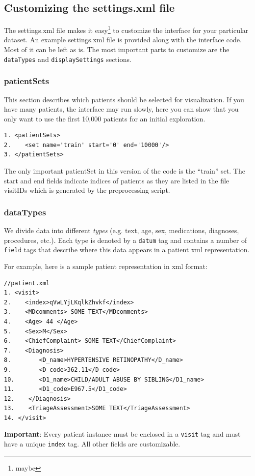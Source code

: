 \documentclass[12pt]{article}
\begin{document}
\subsection{Customizing the settings.xml file}
\label{sec:custom_settings}
The settings.xml file makes it easy\footnote{maybe} to customize the interface for your particular dataset. An example settings.xml file is provided along with the interface code. Most of it can be left as is. The most important parts to customize are the {\tt dataTypes} and {\tt displaySettings} sections.

\subsubsection{patientSets}
This section describes which patients should be selected for visualization. If you have many patients, the interface may run slowly, here you can show that you only want to use the first 10,000 patients for an initial exploration.

\begin{verbatim}
1. <patientSets>
2.    <set name='train' start='0' end='10000'/>
3. </patientSets>
\end{verbatim}

The only important patientSet in this version of the code is the ``train'' set. The start and end fields indicate indices of patients as they are listed in the file visitIDs which is generated by the preprocessing script.


\subsubsection{dataTypes}
\label{sec:dataTypes}
We divide data into different {\em types} (e.g. text, age, sex, medications, diagnoses, procedures, etc.). Each type is denoted by a {\tt datum} tag and contains a number of {\tt field} tags that describe where this data appears in a patient xml representation.

For example, here is a sample patient representation in xml format:

\begin{verbatim}
//patient.xml
1. <visit>
2.    <index>qVwLYjLKqlkZhvkf</index>
3.    <MDcomments> SOME TEXT</MDcomments>
4.    <Age> 44 </Age>
5.    <Sex>M</Sex>
6.    <ChiefComplaint> SOME TEXT</ChiefComplaint>
7.    <Diagnosis>
8.        <D_name>HYPERTENSIVE RETINOPATHY</D_name>
9.        <D_code>362.11</D_code>
10.       <D1_name>CHILD/ADULT ABUSE BY SIBLING</D1_name>
11.       <D1_code>E967.5</D1_code>
12.    </Diagnosis>
13.    <TriageAssessment>SOME TEXT</TriageAssessment>
14. </visit>
\end{verbatim}
{\bf Important}: Every patient instance must be enclosed in a {\tt visit} tag and must have a unique {\tt index} tag. All other fields are customizable.
\end{document}
